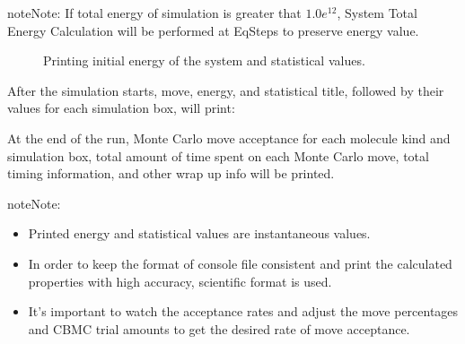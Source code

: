 \documentclass[letterpaper,10pt,english]{sphinxmanual}
\begin{document}
\begin{sphinxadmonition}{note}{Note:}
\sphinxAtStartPar
If total energy of simulation is greater that \(1.0e^{12}\), System Total Energy
Calculation will be performed at EqSteps to preserve energy value.
\end{sphinxadmonition}

\begin{figure}[htbp]
\centering
\capstart

\noindent{}
\caption{Printing initial energy of the system and statistical values.}\label{\detokenize{output_file:id4}}\end{figure}

\sphinxAtStartPar
After the simulation starts, move, energy, and statistical title, followed by their values for each simulation box, will print:

\begin{figure}[htbp]
\centering

\noindent{}
\end{figure}

\sphinxAtStartPar
At the end of the run, Monte Carlo move acceptance for each molecule kind and simulation box, total amount of time spent on each
Monte Carlo move, total timing information, and other wrap up info will be printed.

\begin{sphinxadmonition}{note}{Note:}\begin{itemize}
\item {} 
\sphinxAtStartPar
Printed energy and statistical values are instantaneous values.

\item {} 
\sphinxAtStartPar
In order to keep the format of console file consistent and print the calculated properties with high accuracy, scientific format is used.

\item {} 
\sphinxAtStartPar
It’s important to watch the acceptance rates and adjust the move percentages and CBMC trial amounts to get the desired rate of move acceptance.

\end{itemize}
\end{sphinxadmonition}
\end{document}
